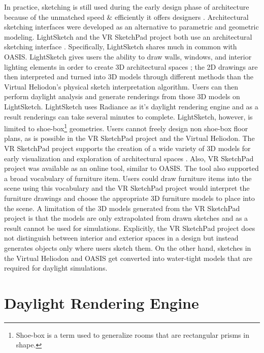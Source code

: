 In practice, sketching is still used during the early design phase of architecture because of the unmatched speed \& efficiently it offers designers \cite{Galasiu}.  Architectural sketching interfaces were developed as an alternative to parametric and geometric modeling.  LightSketch and the VR SketchPad project both use an architectural sketching interface \cite{do2001vr,glaser2003sketch}.  Specifically, LightSketch shares much in common with OASIS.  LightSketch gives users the ability to draw walls, windows, and interior lighting elements in order to create 3D architectural spaces \cite{glaser2003sketch}; the 2D drawings are then interpreted and turned into 3D models through different methods than the Virtual Heliodon's physical sketch interpretation algorithm.  Users can then perform daylight analysis and generate renderings from those 3D models on LightSketch.  LightSketch uses Radiance as it's daylight rendering engine and as a result renderings can take several minutes to complete.  LightSketch, however, is limited to shoe-box\footnote{Shoe-box is a term used to generalize rooms that are rectangular prisms in shape.} geometries.  Users cannot freely design non shoe-box floor plans, as is possible in the VR SketchPad project and the Virtual Heliodon.  The VR SketchPad project supports the creation of a wide variety of 3D models for early visualization and exploration of architectural spaces \cite{do2001vr}.  Also, VR SketchPad project was available as an online tool, similar to OASIS.  The tool also supported a broad vocabulary of furniture item.  Users could draw furniture items into the scene using this vocabulary and the VR SketchPad project would interpret the furniture drawings and choose the appropriate 3D furniture models to place into the scene.  A limitation of the 3D models generated from the VR SketchPad project is that the models are only extrapolated from drawn sketches and as a result cannot be used for simulations.  Explicitly, the VR SketchPad project does not distinguish between interior and exterior spaces in a design but instead generates objects only where users sketch them.  On the other hand, sketches in the Virtual Heliodon and OASIS get converted into water-tight models that are required for daylight simulations.\\

\section{Daylight Rendering Engine}

